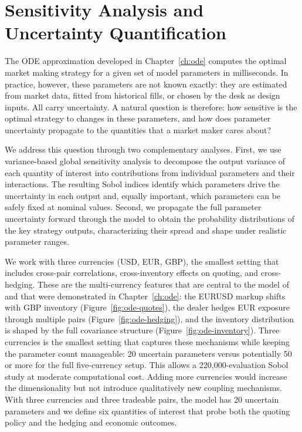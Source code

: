 \chapter{Sensitivity Analysis and Uncertainty Quantification}
\label{ch:sensitivity}

The ODE approximation developed in Chapter~\ref{ch:ode} computes the optimal market making strategy for a given set of model parameters in milliseconds. In practice, however, these parameters are not known exactly: they are estimated from market data, fitted from historical fills, or chosen by the desk as design inputs. All carry uncertainty. A natural question is therefore: how sensitive is the optimal strategy to changes in these parameters, and how does parameter uncertainty propagate to the quantities that a market maker cares about?

We address this question through two complementary analyses. First, we use variance-based global sensitivity analysis \cite{sobol2001, saltelli2008} to decompose the output variance of each quantity of interest into contributions from individual parameters and their interactions. The resulting Sobol indices identify which parameters drive the uncertainty in each output and, equally important, which parameters can be safely fixed at nominal values. Second, we propagate the full parameter uncertainty forward through the model to obtain the probability distributions of the key strategy outputs, characterizing their spread and shape under realistic parameter ranges.

We work with three currencies (USD, EUR, GBP), the smallest setting that includes cross-pair correlations, cross-inventory effects on quoting, and cross-hedging. These are the multi-currency features that are central to the model of~\cite{barzykin2023} and that were demonstrated in Chapter~\ref{ch:ode}: the EURUSD markup shifts with GBP inventory (Figure~\ref{fig:ode-quotes}), the dealer hedges EUR exposure through multiple pairs (Figure~\ref{fig:ode-hedging}), and the inventory distribution is shaped by the full covariance structure (Figure~\ref{fig:ode-inventory}). Three currencies is the smallest setting that captures these mechanisms while keeping the parameter count manageable: 20 uncertain parameters versus potentially 50 or more for the full five-currency setup. This allows a 220{,}000-evaluation Sobol study at moderate computational cost. Adding more currencies would increase the dimensionality but not introduce qualitatively new coupling mechanisms. With three currencies and three tradeable pairs, the model has 20 uncertain parameters and we define six quantities of interest that probe both the quoting policy and the hedging and economic outcomes.

